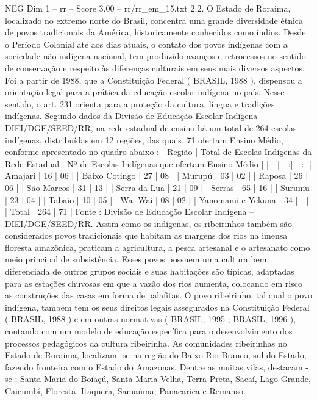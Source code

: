 \begin{textsample}{NEG Dim 1 – rr – Score 3.00 – rr/rr\_em\_15.txt}  \label{ex:f1_neg_076}
2.2.
O Estado de Roraima, localizado no extremo norte do Brasil, concentra uma grande diversidade étnica de povos tradicionais da América, historicamente conhecidos como índios.
Desde o Período Colonial até aos dias atuais, o contato dos povos indígenas com a sociedade não indígena nacional, tem produzido avanços e retrocessos no sentido de conservação e respeito às diferenças culturais em seus mais diversos aspectos.
Foi a partir de 1988, que a Constituição Federal ( BRASIL, 1988 ), dispensou a orientação legal para a prática da educação escolar indígena no país.
Nesse sentido, o art. 231 orienta para a proteção da cultura, língua e tradições indígenas.
Segundo dados da Divisão de Educação Escolar Indígena – DIEI/DGE/SEED/RR, na rede estadual de ensino há um total de 264 escolas indígenas, distribuídas em 12 regiões, das quais, 71 ofertam Ensino Médio, conforme apresentado no quadro abaixo : | Região | Total de Escolas Indígenas da Rede Estadual | Nº de Escolas Indígenas que ofertam Ensino Médio | |---|---:|---:| | Amajari | 16 | 06 | | Baixo Cotingo | 27 | 08 | | Murupú | 03 | 02 | | Raposa | 26 | 06 | | São Marcos | 31 | 13 | | Serra da Lua | 21 | 09 | | Serras | 65 | 16 | | Surumu | 23 | 04 | | Tabaio | 10 | 05 | | Wai Wai | 08 | 02 | | Yanomami e Yekuna | 34 | - | | Total | 264 | 71 | Fonte : Divisão de Educação Escolar Indígena – DIEI/DGE/SEED/RR.
Assim como os indígenas, os ribeirinhos também são considerados povos tradicionais que habitam as margens dos rios na imensa floresta amazônica, praticam a agricultura, a pesca artesanal e o artesanato como meio principal de subsistência.
Esses povos possuem uma cultura bem diferenciada de outros grupos sociais e suas habitações são típicas, adaptadas para as estações chuvosas em que a vazão dos rios aumenta, colocando em risco as construções das casas em forma de palafitas.
O povo ribeirinho, tal qual o povo indígena, também tem os seus direitos legais assegurados na Constituição Federal ( BRASIL, 1988 ) e em outras normativas ( BRASIL, 1995 ; BRASIL, 1996 ), contando com um modelo de educação específica para o desenvolvimento dos processos pedagógicos da cultura ribeirinha.
As comunidades ribeirinhas no Estado de Roraima, localizam -se na região do Baixo Rio Branco, sul do Estado, fazendo fronteira com o Estado do Amazonas.
Dentre as muitas vilas, destacam -se : Santa Maria do Boiaçú, Santa Maria Velha, Terra Preta, Sacaí, Lago Grande, Caicumbí, Floresta, Itaquera, Samaúma, Panacarica e Remanso.

\end{textsample}
